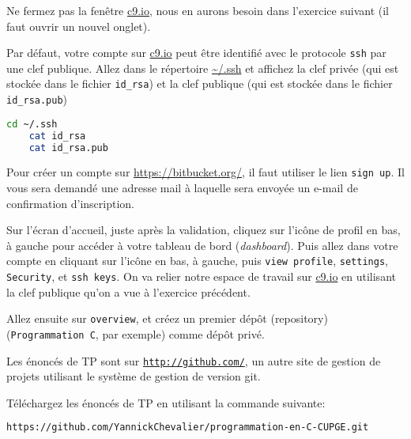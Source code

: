 \begin{fminipage}{0.9\textwidth}
  Ne fermez pas la fenêtre \url{c9.io}, nous en aurons besoin dans
  l'exercice suivant (il faut ouvrir un nouvel onglet).
\end{fminipage}

\question Par défaut, votre compte sur \url{c9.io} peut être identifié
avec le protocole \texttt{ssh} par une clef publique. Allez dans le répertoire \url{~/.ssh} et affichez la clef privée (qui est stockée dans le fichier \texttt{id\_rsa}) et la clef publique (qui est stockée dans le fichier \texttt{id\_rsa.pub})


\begin{solution}
  \begin{lstlisting}[language=bash]
    cd ~/.ssh
    cat id_rsa
    cat id_rsa.pub
  \end{lstlisting}
\end{solution}


Pour créer un compte sur \url{https://bitbucket.org/}, il faut
utiliser le lien \texttt{sign up}. Il vous sera demandé une adresse
mail à laquelle sera envoyée un e-mail de confirmation d'inscription.


\question Sur l'écran d'accueil, juste après la validation, cliquez
sur l'icône de profil en bas, à gauche pour accéder à votre tableau de
bord (\emph{dashboard}). Puis allez dans votre compte en cliquant sur
l'icône en bas, à gauche, puis \texttt{view profile},
\texttt{settings}, \texttt{Security}, et \texttt{ssh keys}. On va
relier notre espace de travail sur \url{c9.io} en utilisant la clef
publique qu'on a vue à l'exercice précédent.

\question Allez ensuite sur \texttt{overview}, et créez un premier
dépôt (repository) (\texttt{Programmation C}, par exemple) comme dépôt
privé. 




Les énoncés de TP sont sur \texttt{\url{http://github.com/}}, un autre
site de gestion de projets utilisant le système de gestion de version git.

\question Téléchargez les énoncés de TP en utilisant la commande suivante:
\begin{lstlisting}[language=bash]
  https://github.com/YannickChevalier/programmation-en-C-CUPGE.git
\end{lstlisting}


